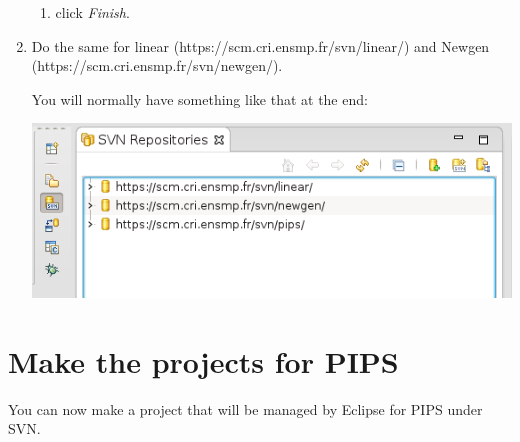 \documentclass[a4paper]{article}
\begin{document}
\begin{enumerate}
\begin{enumerate}
\item click \emph{Finish}.
\end{enumerate}

\item Do the same for linear (https://scm.cri.ensmp.fr/svn/linear/) and Newgen (https://scm.cri.ensmp.fr/svn/newgen/).

You will normally have something like that at the end:
\begin{center}
\noindent
\includegraphics[scale=0.4]{eclipse/02-eclipseJUNO-newRepositories4.png}
\end{center}
\end{enumerate}


\section{Make the projects for PIPS}
\label{sec:makeproject}

You can now make a project that will be managed by Eclipse for PIPS under SVN.
\end{document}
